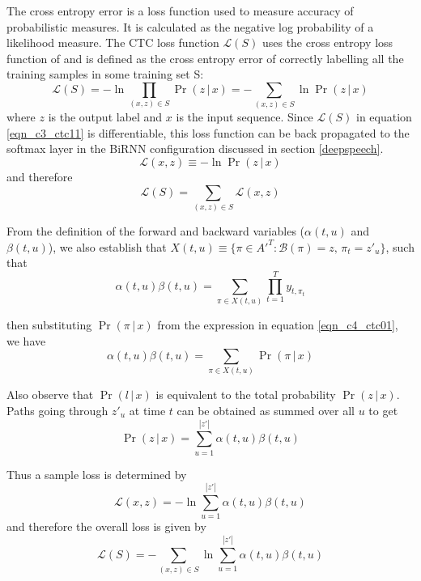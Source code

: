 The cross entropy error is a loss function used to measure accuracy of probabilistic measures.  It is calculated as the negative log probability of a likelihood measure.  The CTC loss function $\mathcal{L}(S)$ uses the cross entropy loss function of and is defined as the cross entropy error of correctly labelling all the training samples in some training set S:
\begin{equation}
\mathcal{L}(S) = - \ln \prod_{(x,z) \in S} \Pr(z \, | \, x) = - \sum_{(x,z) \in S} \ln \Pr(z \, | \, x)
\label{eqn_c3_ctc11}\end{equation}
where $z$ is the output label and $x$ is the input sequence.  Since $\mathcal{L}(S)$ in equation \ref{eqn_c3_ctc11} is differentiable, this loss function can be back propagated to the softmax layer in the BiRNN configuration discussed in section \ref{deepspeech}.
\begin{equation}
\mathcal{L}(x,z) \equiv - \ln \Pr(z \, | \, x)
\label{eqn_c3_ctc12}\end{equation}
and therefore 
\begin{equation}
\mathcal{L}(S) = \sum_{(x,z) \in S} \mathcal{L}(x,z)
\label{eqn_c3_ctc12}\end{equation}

From the definition of the forward and backward variables ($\alpha(t, u)$ and $\beta(t, u)$), we also establish that $X(t,u) \equiv \{ \pi \in A'^T : \mathcal{B}(\pi) = z, \, \pi_t = z'_u \}$, such that
\begin{equation}
\alpha(t, u) \beta(t, u) = \sum_{\pi \in X(t,u)} \prod_{t = 1}^{T} y_{t, \pi_t}\label{eqn_c3_ctc13}\end{equation}

then substituting $\Pr(\pi \, | \, x)$ from the expression in equation \ref{eqn_c4_ctc01}, we have
\begin{equation}
\alpha(t, u) \beta(t, u) = \sum_{\pi \in X(t,u)} \Pr(\pi \, | \, x)
\label{eqn_c3_ctc14}\end{equation}

Also observe that $\Pr(l \, | \, x)$ is equivalent to the total probability $\Pr(z \, | \, x)$. Paths going through $z'_u$ at time $t$ can be obtained as summed over all $u$ to get
\begin{equation}
\Pr(z \, | \, x) = \sum_{u = 1}^{|z'|} \alpha(t, u) \beta(t, u)
\label{eqn_c3_ctc15}\end{equation}

Thus a sample loss is determined by
\begin{equation}
\mathcal{L}(x, z) = - \ln \sum_{u = 1}^{|z'|} \alpha(t, u) \beta(t, u)\label{eqn_c3_ctc16}
\end{equation}
and therefore the overall loss is given by
\begin{equation}\mathcal{L}(S) = -\sum_{(x,z) \in S} \ln \sum_{u = 1}^{|z'|} \alpha(t, u) \beta(t, u)
\label{eqn_c3_ctc17}\end{equation}

